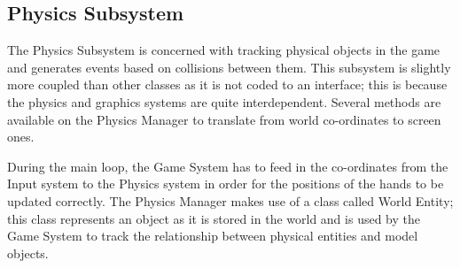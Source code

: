 \clearpage{}
\subsection{Physics Subsystem}
The Physics Subsystem is concerned with tracking physical objects in the game
and generates events based on collisions between them. This subsystem is 
slightly more coupled than other classes as it is not coded to an interface; 
this is because the physics and graphics systems are quite interdependent. 
Several methods are available on the Physics Manager to translate from world 
co-ordinates to screen ones. 

During the main loop, the Game System has to feed in the co-ordinates from the
Input system to the Physics system in order for the positions of the hands to 
be updated correctly. The Physics Manager makes use of a class called World
Entity; this class represents an object as it is stored in the world and is 
used by the Game System to track the relationship between physical entities and
model objects.

